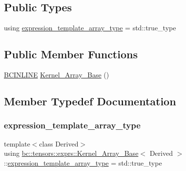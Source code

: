 \subsection*{Public Types}
\begin{DoxyCompactItemize}
\item 
using \hyperlink{structbc_1_1tensors_1_1exprs_1_1Kernel__Array__Base_ae62c36fd1de3835ad300b04cf81e87c9}{expression\+\_\+template\+\_\+array\+\_\+type} = std\+::true\+\_\+type
\end{DoxyCompactItemize}
\subsection*{Public Member Functions}
\begin{DoxyCompactItemize}
\item 
\hyperlink{common_8h_a6699e8b0449da5c0fafb878e59c1d4b1}{B\+C\+I\+N\+L\+I\+NE} \hyperlink{structbc_1_1tensors_1_1exprs_1_1Kernel__Array__Base_a2f8191bf06d41edf9181dc6e0692e3ce}{Kernel\+\_\+\+Array\+\_\+\+Base} ()
\end{DoxyCompactItemize}


\subsection{Member Typedef Documentation}
\mbox{\label{structbc_1_1tensors_1_1exprs_1_1Kernel__Array__Base_ae62c36fd1de3835ad300b04cf81e87c9}} 
\subsubsection{\texorpdfstring{expression\+\_\+template\+\_\+array\+\_\+type}{expression\_template\_array\_type}}
{\footnotesize\ttfamily template$<$class Derived$>$ \\
using \hyperlink{structbc_1_1tensors_1_1exprs_1_1Kernel__Array__Base}{bc\+::tensors\+::exprs\+::\+Kernel\+\_\+\+Array\+\_\+\+Base}$<$ Derived $>$\+::\hyperlink{structbc_1_1tensors_1_1exprs_1_1Kernel__Array__Base_ae62c36fd1de3835ad300b04cf81e87c9}{expression\+\_\+template\+\_\+array\+\_\+type} =  std\+::true\+\_\+type}



